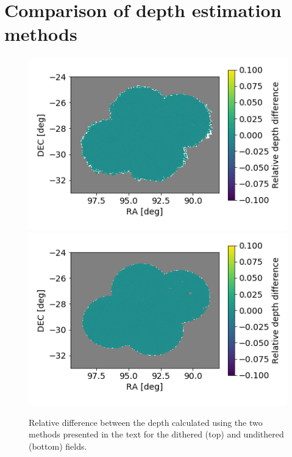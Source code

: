 \documentclass[\docopts]{\docclass}
\begin{document}
\section{Comparison of depth estimation methods}
\begin{figure}
\centering
\includegraphics[width=0.9\columnwidth]{dithered_difference.png}
\includegraphics[width=0.9\columnwidth]{undithered_difference.png}
\caption{Relative difference between the depth calculated using the two methods presented in the text for the dithered (top) and undithered (bottom) fields.}
\label{fig:depth_comparison}
\end{figure}
\end{document}
